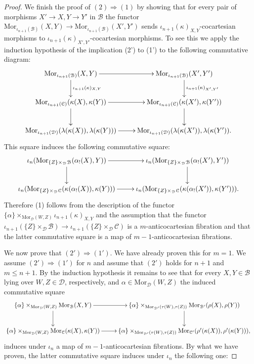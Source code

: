 \documentclass[10pt,oneside]{article}
\numberwithin{equation}{section} %
\numberwithin{figure}{section} %
\theoremstyle{plain}
\theoremstyle{definition}
\newcommand{\mB}{{\mathcal B}}
\newcommand{\mC}{{\mathcal C}}
\newcommand{\mD}{{\mathcal D}}
\newcommand{\Mor}{{\mathrm{Mor}}}
\begin{document}
\begin{proof}
We finish the proof of $(2)\Rightarrow (1)$ by showing that for every pair of morphisms $X' \to X, Y \to Y'$ in $\mB$
the functor $\Mor_{\iota_{n+1}(\mB)}(X,Y) \to \Mor_{\iota_{n+1}(\mB)}(X',Y')$ sends $\iota_{n+1}(\kappa)_{X,Y}$-cocartesian morphisms to
$\iota_{n+1}(\kappa)_{X',Y'}$-cocartesian morphisms.
To see this we apply the induction hypothesis of the implication (2') to (1') to the following commutative diagram:
\begin{equation}\label{sqcoo}
\begin{xy}
\xymatrix{
\Mor_{\iota_{n+1}(\mB)}(X,Y) \ar[d]^{\iota_{n+1}(\kappa)_{X,Y}} \ar[r]
& \Mor_{\iota_{n+1}(\mB)}(X',Y') \ar[d]^{\iota_{n+1}(\kappa)_{X',Y'}}
\\ 
\Mor_{\iota_{n+1}(\mC)}(\kappa(X),\kappa(Y)) \ar[d] \ar[r] & \Mor_{\iota_{n+1}(\mC)}(\kappa(X'),\kappa(Y')) \ar[d]
\\ 
\Mor_{\iota_{n+1}(\mD)}(\lambda(\kappa(X)),\lambda(\kappa(Y))) \ar[r] & \Mor_{\iota_{n+1}(\mD)}(\lambda(\kappa(X')),\lambda(\kappa(Y')).
}
\end{xy}\end{equation}
This square induces the following commutative square:
\begin{equation*}
\begin{xy}
\xymatrix{
\iota_n(\Mor_{\{Z\} \times_\mD \mB}(\alpha_!(X),Y))
\ar[d] \ar[r]
& \iota_n(\Mor_{\{Z\} \times_\mD \mB}(\alpha_!(X'),Y')) \ar[d]
\\ 
\iota_n(\Mor_{\{Z\} \times_\mD \mC}(\kappa(\alpha_!(X)),\kappa(Y))) \ar[r] & \iota_n(\Mor_{\{Z\} \times_\mD \mC}(\kappa(\alpha_!(X')),\kappa(Y'))).
}
\end{xy}\end{equation*}
Therefore (1) follows from the description of the functor $\{\alpha\} \times_{\Mor_\mD(W, Z)} \iota_{n+1}(\kappa)_{X,Y}$ and the assumption that the functor $
\iota_{n+1}(\{Z\} \times_\mD \mB) \to  \iota_{n+1}(\{Z\} \times_\mD \mC)$ is a $m$-anticocartesian fibration and that the latter commutative square is a map of $m-1$-anticocartesian fibrations.

We now prove that $(2')\Rightarrow (1')$.
We have already proven this for $m=1.$
We assume $(2')\Rightarrow (1')$ for $n$
and assume that $(2')$ holds for $n+1$ and $m \leq n+1.$
By the induction hypothesis it remains to see that for every $X,Y \in \mB$ lying over $W,Z \in \mD$, respectively, and $\alpha \in \Mor_\mD(W,Z) $ the induced commutative square
\begin{equation*}
\begin{xy}
\xymatrix{
\{\alpha\} \times_{\Mor_\mD(W,Z)} \Mor_\mB(X,Y) \ar[d] \ar[r]
& \{\alpha\} \times_{\Mor_{\mD'}(\tau(W),\tau(Z))} \Mor_{\mB'}(\rho(X),\rho(Y)) \ar[d]
\\ 
\{\alpha\} \times_{\Mor_\mD(W,Z)} \Mor_\mC(\kappa(X),\kappa(Y)) \ar[r] & \{\alpha\} \times_{\Mor_{\mD'}(\tau(W),\tau(Z))} \Mor_{\mC'}(\rho'(\kappa(X)),\rho'(\kappa(Y))),
}
\end{xy}\end{equation*}
induces under $\iota_n$ a map of $m-1$-anticocartesian fibrations.
By what we have proven, the latter commutative square induces under $\iota_n$ the following one:


\end{proof}
\end{document}
